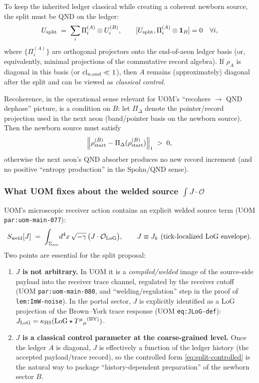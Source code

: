 \documentclass[11pt]{article}
\theoremstyle{definition}
\theoremstyle{plain}
\theoremstyle{remark}
\newcommand{\norm}[1]{\left\lVert #1\right\rVert}
\begin{document}
To keep the inherited ledger classical while creating a coherent newborn source, the split must be QND on the ledger:
\begin{equation}
U_{\rm split}
\;=\;
\sum_i \Pi_i^{(A)}\otimes U_i^{(B)},
\qquad
[U_{\rm split},\Pi_i^{(A)}\otimes \mathbf 1_B]=0\quad\forall i,
\label{eq:split-controlled}
\end{equation}
where $\{\Pi_i^{(A)}\}$ are orthogonal projectors onto the end-of-aeon ledger basis (or, equivalently, minimal
projections of the commutative record algebra).
If $\rho_A$ is diagonal in this basis (or $\mathrm{cl}_{n,{\rm end}}\ll 1$), then $A$ remains (approximately) diagonal
after the split and can be viewed as \emph{classical control}.

Recoherence, in the operational sense relevant for UOM's ``recohere $\to$ QND dephase'' picture, is a condition on $B$:
let $\Pi_\Delta$ denote the pointer/record projection used in the next aeon (band/pointer basis on the newborn source).
Then the newborn source must satisfy
\begin{equation}
\norm{\rho^{(B)}_{\rm start}-\Pi_\Delta(\rho^{(B)}_{\rm start})}_1 \;>\; 0,
\label{eq:B-coherence-target}
\end{equation}
otherwise the next aeon's QND absorber produces no new record increment (and no positive ``entropy production'' in the
Spohn/QND sense).

\subsubsection*{What UOM fixes about the welded source $\int J\cdot\mathcal O$}
\label{subsec:welded-source-fixed}

UOM's microscopic receiver action contains an explicit welded source term (UOM \texttt{par:uom-main-077}):
\begin{equation}
S_{\rm weld}[J]
\;=\;
\int_{\Sigma_{\rm rec}}\! d^4x\,\sqrt{-\gamma}\,\big(J\cdot \mathcal O_{\rm LoG}\big),
\qquad
J\equiv J_k\ \text{(tick-localized LoG envelope).}
\label{eq:Sweld-note}
\end{equation}
Two points are essential for the split proposal:
\begin{enumerate}[leftmargin=2em]
\item \textbf{$J$ is not arbitrary.}
In UOM it is a \emph{compiled/welded} image of the source-side payload into the receiver trace channel, regulated by the
receiver cutoff (UOM \texttt{par:uom-main-080}, and ``welding/regulation'' step in the proof of
\texttt{lem:ImW-noise}).
In the portal sector, $J$ is explicitly identified as a LoG projection of the Brown--York trace response
(UOM \texttt{eq:JLoG-def}): $J_{\rm LoG}=\kappa_{\rm HS}(\mathrm{LoG}\star T^\mu{}_\mu{}^{\rm (BY)})$.
\item \textbf{$J$ is a classical control parameter at the coarse-grained level.}
Once the ledger $A$ is diagonal, $J$ is effectively a function of the ledger history (the accepted payload/trace record),
so the controlled form \eqref{eq:split-controlled} is the natural way to package ``history-dependent preparation'' of the
newborn sector $B$.
\end{enumerate}
\end{document}
